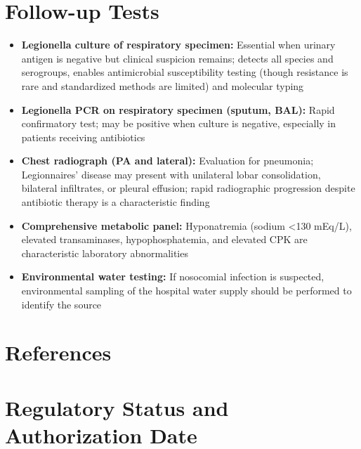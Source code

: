 \section*{Follow-up Tests}
\begin{itemize}
  \item \textbf{Legionella culture of respiratory specimen:} Essential when urinary antigen is negative but clinical suspicion remains; detects all species and serogroups, enables antimicrobial susceptibility testing (though resistance is rare and standardized methods are limited) and molecular typing
  \item \textbf{Legionella PCR on respiratory specimen (sputum, BAL):} Rapid confirmatory test; may be positive when culture is negative, especially in patients receiving antibiotics
  \item \textbf{Chest radiograph (PA and lateral):} Evaluation for pneumonia; Legionnaires' disease may present with unilateral lobar consolidation, bilateral infiltrates, or pleural effusion; rapid radiographic progression despite antibiotic therapy is a characteristic finding
  \item \textbf{Comprehensive metabolic panel:} Hyponatremia (sodium <130 mEq/L), elevated transaminases, hypophosphatemia, and elevated CPK are characteristic laboratory abnormalities
  \item \textbf{Environmental water testing:} If nosocomial infection is suspected, environmental sampling of the hospital water supply should be performed to identify the source
\end{itemize}

\section*{References}



\clearpage
\section*{Regulatory Status and Authorization Date}

\clearpage
